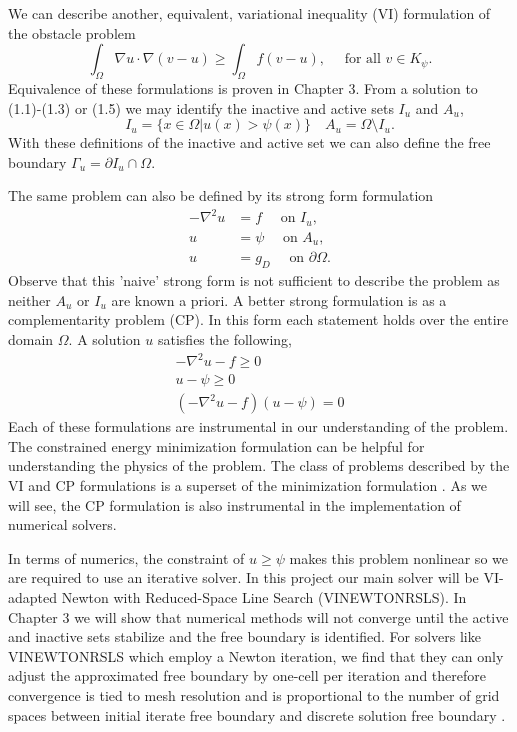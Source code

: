 \documentclass[]{interact}
\theoremstyle{plain}%
\theoremstyle{definition}
\theoremstyle{remark}
\begin{document}
  We can describe another, equivalent, variational inequality (VI) formulation of the obstacle problem 
  \begin{equation}
    \int_\Omega \nabla u \cdot \nabla(v - u) \geq \int_\Omega f(v - u), \quad \text{ for all } v \in K_\psi.
  \end{equation} 
  Equivalence of these formulations is proven in Chapter 3. From a solution to (1.1)-(1.3) or (1.5) we may identify the inactive and active sets $I_u$ and $A_u$,
\begin{equation}
  I_u = \{x \in \Omega | u(x) > \psi(x)\} \quad A_u = \Omega \setminus I_u.
\end{equation} 
With these definitions of the inactive and active set we can also define the free boundary $\Gamma_u = \partial I_u \cap \Omega$.

The same problem can also be defined by its strong form formulation
\begin{align}
  -\nabla^2 u &= f \quad \text{ on } I_u,\\
  u &= \psi \quad \text{ on } A_u,\\
  u &= g_D \quad \text{ on } \partial \Omega.
\end{align}
 Observe that this 'naive' strong form is not sufficient to describe the problem as neither $A_u$ or $I_u$ are known a priori. A better strong formulation is as a complementarity problem (CP). In this form each statement holds over the entire domain $\Omega$. A solution $u$ satisfies the following, 
\begin{align}
  -\nabla^2 u - f \geq 0\\
  u - \psi \geq 0\\
  (-\nabla^2u - f)(u - \psi) = 0
\end{align}
Each of these formulations are instrumental in our understanding of the problem. The constrained energy minimization formulation can be helpful for understanding the physics of the problem. The class of problems described by the VI and CP formulations is a superset of the minimization formulation \citep[page 319]{bueler_petsc_2021}. As we will see, the CP formulation is also instrumental in the implementation of numerical solvers.

In terms of numerics, the constraint of $u \geq \psi$ makes this problem nonlinear so we are required to use an iterative solver. In this project our main solver will be VI-adapted Newton with Reduced-Space Line Search (VINEWTONRSLS). In Chapter 3 we will show that numerical methods will not converge until the active and inactive sets stabilize and the free boundary is identified. For solvers like VINEWTONRSLS which employ a Newton iteration, we find that they can only adjust the approximated free boundary by one-cell per iteration \citep{graser_multigrid_2009} and therefore convergence is tied to mesh resolution and is proportional to the number of grid spaces between initial iterate free boundary and discrete solution free boundary \citep[page 324]{bueler_petsc_2021}. 
\end{document}
